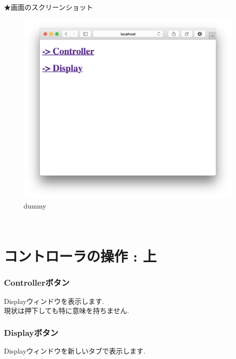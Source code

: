 \documentclass[a4paper,10pt,oneside]{jsbook}
\begin{document}
★画面のスクリーンショット
\begin{figure}[htbp]
	\begin{center}
		\includegraphics[width=11.5cm]{image/home.png}
	\end{center}
	\caption{dummy}
	\label{fig:home}
\end{figure}
\\


\chapter{コントローラの操作 : 上}
\subsection{Controllerボタン}
Displayウィンドウを表示します.\\
現状は押下しても特に意味を持ちません.\\

\subsection{Displayボタン}
Displayウィンドウを新しいタブで表示します.\\
\end{document}
